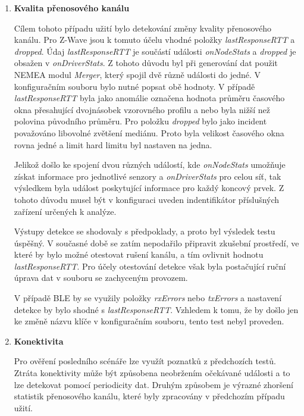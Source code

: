 \begin{enumerate}
    \item \textbf{Kvalita přenosového kanálu}
    
    Cílem tohoto případu užití bylo detekování změny kvality přenosového kanálu. Pro Z-Wave jsou 
    k tomuto účelu vhodné položky \textit{lastResponseRTT} a \textit{dropped}. Údaj
    \textit{lastResponseRTT} je součástí události \textit{onNodeStats} a 
    \textit{dropped} je obsažen v \textit{onDriverStats}. Z tohoto důvodu byl při generování dat použit
    NEMEA modul \textit{Merger}, který spojil dvě různě události do jedné. V konfiguračním souboru
    bylo nutné popsat obě hodnoty. V případě \textit{lastResponseRTT} byla jako anomálie označena
    hodnota průměru časového okna přesahující dvojnásobek vzorovného profilu a nebo byla nižší
    než polovina původního průměru. Pro položku \textit{dropped} bylo jako incident považováno
    libovolné zvětšení mediánu. Proto byla velikost časového okna rovna jedné a limit hard limitu byl
    nastaven na jedna. 
    
    Jelikož došlo ke spojení dvou různých událostí, kde \textit{onNodeStats}
    umožňuje získat informace pro jednotlivé senzory a \textit{onDriverStats} pro celou síť, 
    tak výsledkem byla událost poskytující informace pro každý koncový prvek. Z tohoto důvodu 
    musel být v konfiguraci uveden indentifikátor příslušných zařízení určených k analýze.
    
    Výstupy detekce se shodovaly s předpoklady, a proto byl výsledek testu úspěšný. V současné
    době se zatím nepodařilo připravit zkušební prostředí, ve které by bylo možné otestovat
    rušení kanálu, a tím ovlivnit hodnotu \textit{lastResponseRTT}. Pro účely otestování 
    detekce však byla postačující ruční úprava dat v souboru se zachyceným provozem. 
    
    V případě BLE by se využily položky \textit{rxErrors} nebo \textit{txErrors} a nastavení 
    detekce by bylo shodné s \textit{lastResponseRTT}. Vzhledem k tomu, že by došlo jen 
    ke změně názvu klíče v konfiguračním souboru, tento test nebyl proveden.
    
    \item \textbf{Konektivita}
    
    Pro ověření posledního scénáře lze využít poznatků z předchozích testů. Ztráta konektivity
    může být způsobena neobržením očekávané události a to lze detekovat pomocí periodicity dat.
    Druhým způsobem je výrazné zhoršení statistik přenosového kanálu, které byly zpracovány
    v předchozím případu užití.
  \end{enumerate}
  
